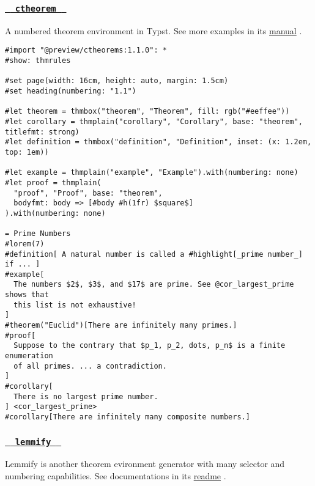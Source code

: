 \subsubsection{\texorpdfstring{\hyperref[ctheorem]{\texttt{\ }{\texttt{\ ctheorem\ }}\texttt{\ }}}{  ctheorem  }}\label{ctheorem}

A numbered theorem environment in Typst. See more examples in its
\href{https://github.com/sahasatvik/typst-theorems/blob/main/manual.pdf}{manual}
.

\begin{verbatim}
#import "@preview/ctheorems:1.1.0": *
#show: thmrules

#set page(width: 16cm, height: auto, margin: 1.5cm)
#set heading(numbering: "1.1")

#let theorem = thmbox("theorem", "Theorem", fill: rgb("#eeffee"))
#let corollary = thmplain("corollary", "Corollary", base: "theorem", titlefmt: strong)
#let definition = thmbox("definition", "Definition", inset: (x: 1.2em, top: 1em))

#let example = thmplain("example", "Example").with(numbering: none)
#let proof = thmplain(
  "proof", "Proof", base: "theorem",
  bodyfmt: body => [#body #h(1fr) $square$]
).with(numbering: none)

= Prime Numbers
#lorem(7)
#definition[ A natural number is called a #highlight[_prime number_] if ... ]
#example[
  The numbers $2$, $3$, and $17$ are prime. See @cor_largest_prime shows that
  this list is not exhaustive!
]
#theorem("Euclid")[There are infinitely many primes.]
#proof[
  Suppose to the contrary that $p_1, p_2, dots, p_n$ is a finite enumeration
  of all primes. ... a contradiction.
]
#corollary[
  There is no largest prime number.
] <cor_largest_prime>
#corollary[There are infinitely many composite numbers.]
\end{verbatim}

\pandocbounded{}

\subsubsection{\texorpdfstring{\hyperref[lemmify]{\texttt{\ }{\texttt{\ lemmify\ }}\texttt{\ }}}{  lemmify  }}\label{lemmify}

Lemmify is another theorem evironment generator with many selector and
numbering capabilities. See documentations in its
\href{https://github.com/Marmare314/lemmify}{readme} .

